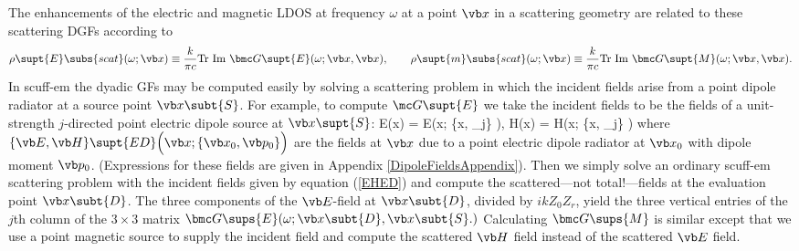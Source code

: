 \documentclass[letterpaper]{article}
\begin{document}
The enhancements of the electric and magnetic LDOS at frequency $\omega$
at a point $\vb x$ in a scattering geometry are related to these
scattering DGFs according to
$$ \rho\supt{E}\subs{scat}(\omega; \vb x)
   \equiv
   \frac{k}{\pi c}\text{Tr }\text{Im } \bmc G\supt{E}(\omega; \vb x, \vb x),
   \qquad
   \rho\supt{m}\subs{scat}(\omega; \vb x)
   \equiv
   \frac{k}{\pi c}\text{Tr }\text{Im } \bmc G\supt{M}(\omega; \vb x, \vb x).
$$
In {\sc scuff-em} the dyadic GFs may be computed easily by solving a
scattering problem in which the incident fields arise from a point dipole
radiator at a source point $\vb x\subt{S}$.
For example, to compute $\mc G\supt{E}$ we take the incident fields 
to be the fields of a unit-strength $j$-directed point electric dipole 
source at $\vb x\supt{S}$:
{
 \vb E(\vb x) =
 \vb E\Big(\vb x; \{\vb x, _j\} \Big),
 \qquad
 \vb H(\vb x) =
 \vb H\Big(\vb x; \{\vb x, _j\} \Big)
}
where $\{\vb E, \vb H\}\supt{ED}\Big(\vb x; \{\vb x_0, \vb p_0\}\Big)$
are the fields at $\vb x$ due to a point electric dipole radiator
at $\vb x_0$ with dipole moment $\vb p_0$.
(Expressions for these fields are given in 
Appendix \ref{DipoleFieldsAppendix}).
Then we simply solve an ordinary {\sc scuff-em} scattering
problem with the incident fields given by equation 
(\ref{EHED}) and compute the scattered---not total!---fields
at the evaluation point $\vb x\subt{D}$. The three components of the
$\vb E$-field at $\vb x\subt{D}$, divided by $ikZ_0 Z_r$, yield the
three vertical entries of the $j$th column of the
$3\times 3$ matrix 
$\bmc G\sups{E}(\omega; \vb x\subt{D}, \vb x\subt{S}.)$
Calculating $\bmc G\sups{M}$ is similar except that we use 
a point magnetic source to supply the incident field 
and compute the scattered $\vb H$ field instead of the 
scattered $\vb E$ field.

\newpage
\end{document}
